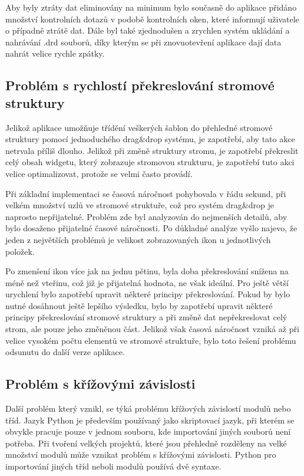 \documentclass[thesis=B,czech]{resources/FITthesis}[2012/06/26]
\begin{document}
Aby byly ztráty dat eliminovány na minimum bylo současně do aplikace přidáno množství kontrolních dotazů v podobě kontrolních oken, které informují uživatele o případně ztrátě dat. Dále byl také zjednodušen a zrychlen systém ukládání a nahrávání .drd souborů, díky kterým se při znovuotevření aplikace dají data nahrát velice rychle zpátky. 

	\subsection{Problém s rychlostí překreslování stromové struktury}
Jelikož aplikace umožňuje třídění veškerých šablon do přehledné stromové struktury pomocí jednoduchého drag\&drop systému, je zapotřebí, aby tato akce netrvala příliš dlouho. Jelikož při změně struktury stromu, je zapotřebí překreslit celý obsah widgetu, který zobrazuje stromovou strukturu, je zapotřebí tuto akci velice optimalizovat, protože se velmi často provádí. \par

Při základní implementaci se časová náročnost pohybovala v řádu sekund, při velkém množství uzlů ve stromové struktuře, což pro systém drag\&drop je naprosto nepřijatelné. Problém zde byl analyzován do nejmenších detailů, aby bylo dosaženo přijatelné časové náročnosti. Po důkladné analýze vyšlo najevo, že jeden z největších problémů je velikost zobrazovaných ikon u jednotlivých položek. \par

Po zmenšení ikon více jak na jednu pětinu, byla doba překreslování snížena na méně než vteřinu, což již je přijatelná hodnota, ne však ideální. Pro ještě větší urychlení bylo zapotřebí upravit některé principy překreslování. Pokud by bylo nutné dosáhnout ještě lepšího výsledku, bylo by zapotřebí upravit některé principy překreslování stromové struktury a při změně dat nepřekreslovat celý strom, ale pouze jeho změněnou část. Jelikož však časová náročnost vzniká až při velice vysokém počtu elementů ve stromové struktuře, bylo toto řešení problému odsunutu do další verze aplikace. 

	\subsection{Problém s křížovými závislosti}
Další problém který vznikl, se týká problému křížových závislostí modulů nebo tříd. Jazyk Python je především používaný jako skriptovací jazyk, při kterém se obvykle pracuje pouze v jednom souboru, kde importování jiných souborů není potřeba. Při tvoření velkých projektů, které jsou přehledně rozděleny na velké množství modulů může vznikat problém s křížovými závislosti. Python pro importování jiných tříd neboli modulů používá dvě syntaxe.
\end{document}
